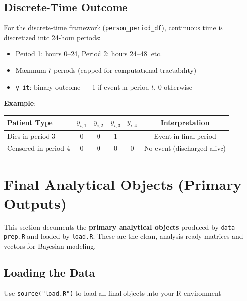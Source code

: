 \documentclass[11pt]{article}
\begin{document}
\subsection{Discrete-Time Outcome}

For the discrete-time framework (\texttt{person\_period\_df}), continuous time is discretized into 24-hour periods:

\begin{itemize}[leftmargin=*, nosep]
    \item Period 1: hours 0--24, Period 2: hours 24--48, etc.
    \item Maximum 7 periods (capped for computational tractability)
    \item \texttt{y\_it}: binary outcome --- 1 if event in period $t$, 0 otherwise
\end{itemize}

\textbf{Example}:
\begin{center}
\begin{tabular}{lccccc}
\toprule
\textbf{Patient Type} & $y_{i,1}$ & $y_{i,2}$ & $y_{i,3}$ & $y_{i,4}$ & \textbf{Interpretation} \\
\midrule
Dies in period 3 & 0 & 0 & 1 & --- & Event in final period \\
Censored in period 4 & 0 & 0 & 0 & 0 & No event (discharged alive) \\
\bottomrule
\end{tabular}
\end{center}

\section{Final Analytical Objects (Primary Outputs)}
\label{sec:final-objects}

This section documents the \textbf{primary analytical objects} produced by \texttt{data-prep.R} and loaded by \texttt{load.R}. These are the clean, analysis-ready matrices and vectors for Bayesian modeling.

\subsection{Loading the Data}

Use \texttt{source("load.R")} to load all final objects into your R environment:
\end{document}
